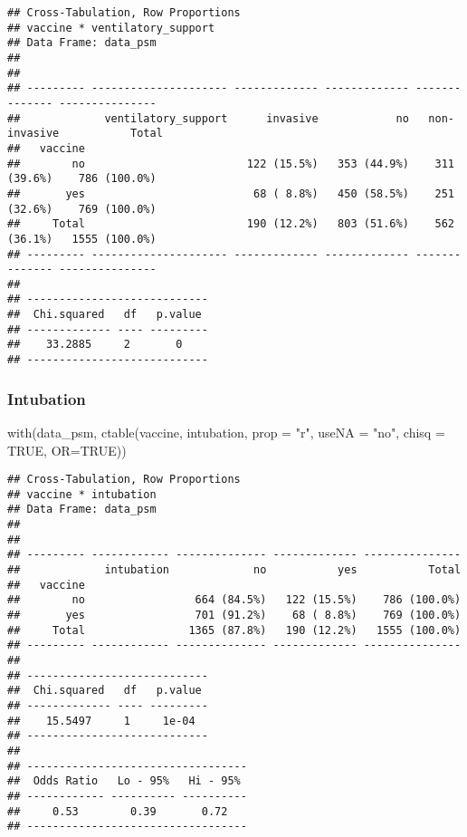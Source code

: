 \documentclass[
]{article}
\newenvironment{Shaded}{\begin{snugshade}}{\end{snugshade}}
\newcommand{\AttributeTok}[1]{\textcolor[rgb]{0.77,0.63,0.00}{#1}}
\newcommand{\ConstantTok}[1]{\textcolor[rgb]{0.00,0.00,0.00}{#1}}
\newcommand{\FunctionTok}[1]{\textcolor[rgb]{0.00,0.00,0.00}{#1}}
\newcommand{\NormalTok}[1]{#1}
\newcommand{\StringTok}[1]{\textcolor[rgb]{0.31,0.60,0.02}{#1}}
\begin{document}
\begin{verbatim}
## Cross-Tabulation, Row Proportions  
## vaccine * ventilatory_support  
## Data Frame: data_psm  
## 
## 
## --------- --------------------- ------------- ------------- -------------- ---------------
##             ventilatory_support      invasive            no   non-invasive           Total
##   vaccine                                                                                 
##        no                         122 (15.5%)   353 (44.9%)    311 (39.6%)    786 (100.0%)
##       yes                          68 ( 8.8%)   450 (58.5%)    251 (32.6%)    769 (100.0%)
##     Total                         190 (12.2%)   803 (51.6%)    562 (36.1%)   1555 (100.0%)
## --------- --------------------- ------------- ------------- -------------- ---------------
## 
## ----------------------------
##  Chi.squared   df   p.value 
## ------------- ---- ---------
##    33.2885     2       0    
## ----------------------------
\end{verbatim}

\hypertarget{intubation-1}{%
\subsubsection{Intubation}\label{intubation-1}}

\begin{Shaded}
\begin{Highlighting}[]
\FunctionTok{with}\NormalTok{(data\_psm, }\FunctionTok{ctable}\NormalTok{(vaccine, intubation, }\AttributeTok{prop =} \StringTok{"r"}\NormalTok{, }\AttributeTok{useNA =} \StringTok{"no"}\NormalTok{, }\AttributeTok{chisq =} \ConstantTok{TRUE}\NormalTok{, }\AttributeTok{OR=}\ConstantTok{TRUE}\NormalTok{))}
\end{Highlighting}
\end{Shaded}

\begin{verbatim}
## Cross-Tabulation, Row Proportions  
## vaccine * intubation  
## Data Frame: data_psm  
## 
## 
## --------- ------------ -------------- ------------- ---------------
##             intubation             no           yes           Total
##   vaccine                                                          
##        no                 664 (84.5%)   122 (15.5%)    786 (100.0%)
##       yes                 701 (91.2%)    68 ( 8.8%)    769 (100.0%)
##     Total                1365 (87.8%)   190 (12.2%)   1555 (100.0%)
## --------- ------------ -------------- ------------- ---------------
## 
## ----------------------------
##  Chi.squared   df   p.value 
## ------------- ---- ---------
##    15.5497     1     1e-04  
## ----------------------------
## 
## ----------------------------------
##  Odds Ratio   Lo - 95%   Hi - 95% 
## ------------ ---------- ----------
##     0.53        0.39       0.72   
## ----------------------------------
\end{verbatim}
\end{document}
